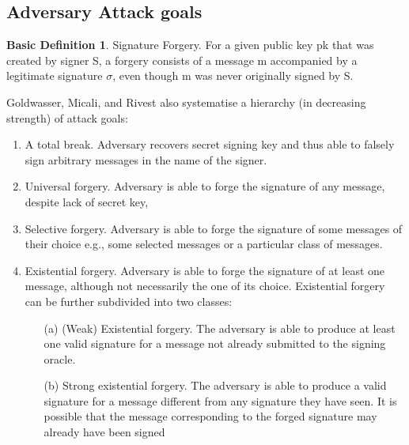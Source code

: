 \documentclass[]{final_report}
\theoremstyle{definition}
\newtheorem{basic}{Basic Definition}
\begin{document}
\subsection{ Adversary Attack goals}
\begin{basic}
Signature Forgery. For a given public key pk that was created by signer S, a forgery consists of a message m accompanied by a legitimate signature $\sigma$, even though m was never originally signed by S.
\end{basic}
Goldwasser, Micali, and Rivest also systematise a hierarchy (in decreasing strength) of attack goals:
\begin{enumerate}
    \item A total break. Adversary recovers secret signing key and thus able to falsely sign arbitrary messages in the name of the signer.
    \item Universal forgery. Adversary is able to forge the signature of any message, despite lack of secret key,
    \item Selective forgery. Adversary is able to forge the signature of some messages of their choice e.g., some selected messages or a particular class of messages.
    \item Existential forgery. Adversary is able to forge the signature of at least one message, although not necessarily the one of its choice. Existential forgery can be further subdivided into two classes:
\begin{itemize}
    \item [(a)] (Weak) Existential forgery. The adversary is able to produce at least one valid signature for a message not already submitted to the signing oracle.
    \item [(b)] Strong existential forgery. The adversary is able to produce a valid signature for a message different from any signature they have seen. It is possible that the message corresponding to the forged signature may already have been signed 
\end{itemize}
\end{enumerate}
\end{document}
